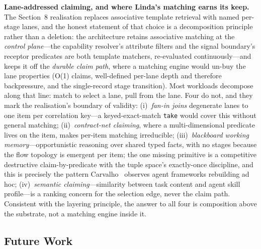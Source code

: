 \documentclass[11pt]{article}
\begin{document}
\textbf{Lane-addressed claiming, and where Linda's matching earns its keep.}
The Section~8 realisation replaces associative template retrieval with named
per-stage lanes, and the honest statement of that choice is a decomposition
principle rather than a deletion: the architecture retains associative matching
at the \emph{control plane}---the capability resolver's attribute filters and
the signal boundary's receptor predicates are both template matchers,
re-evaluated continuously---and keeps it off the \emph{durable claim path},
where a matching engine would un-buy the lane properties (O(1) claims,
well-defined per-lane depth and therefore backpressure, and the single-record
stage transition). Most workloads decompose along that line: match to select a
lane, pull from the lane. Four do not, and they mark the realisation's boundary
of validity: (i)~\emph{fan-in joins} degenerate lanes to one item per
correlation key---a keyed-exact-match \texttt{take} would cover this without
general matching; (ii)~\emph{contract-net claiming}, where a multi-dimensional
predicate lives on the item, makes per-item matching irreducible;
(iii)~\emph{blackboard working memory}---opportunistic reasoning over shared
typed facts, with no stages because the flow topology is emergent per item; the
one missing primitive is a competitive destructive claim-by-predicate with the
tuple space's exactly-once discipline, and this is precisely the pattern
Carvalho~\cite{carvalho} observes agent frameworks rebuilding ad hoc;
(iv)~\emph{semantic claiming}---similarity between task content and agent
skill profile---is a ranking concern for the selection edge, never the claim
path. Consistent with the layering principle, the answer to all four is
composition above the substrate, not a matching engine inside it.

\subsection{Future Work}
\end{document}
